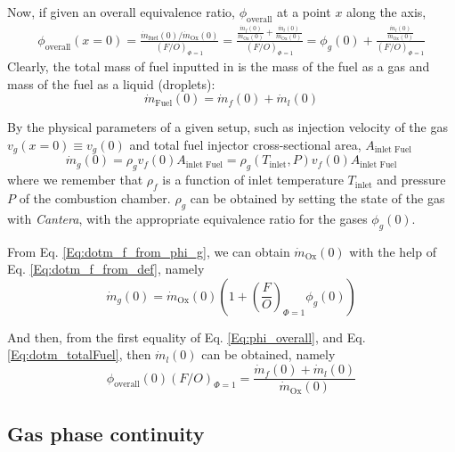 \documentclass[10pt]{amsart}
\begin{document}
\begin{multicols*}{2}
Now, if given an overall equivalence ratio, $\phi_{\text{overall}}$ at a point $x$ along the axis,
\begin{equation}\label{Eq:phi_overall}
\begin{gathered}
  \phi_{\text{overall}}(x=0) = \frac{ \dot{m}_{\text{fuel}}(0)/ \dot{m}_{\text{Ox}}(0) }{ (F/O)_{\Phi=1} } = \frac{ \frac{\dot{m}_f(0) }{ \dot{m}_{\text{Ox}}(0) } + \frac{\dot{m}_l(0) }{ \dot{m}_{\text{Ox}}(0) } }{ (F/O)_{\Phi=1} } = \phi_g(0) + \frac{ \frac{\dot{m}_l(0) }{ \dot{m}_{\text{Ox}}(0) } }{ (F/O)_{\Phi=1} }
\end{gathered}
\end{equation}
Clearly, the total mass of fuel inputted in is the mass of the fuel as a gas and mass of the fuel as a liquid (droplets):
\begin{equation}\label{Eq:dotm_totalFuel}
\dot{m}_{\text{Fuel}}(0) = \dot{m}_f(0) + \dot{m}_l(0)
\end{equation}

By the physical parameters of a given setup, such as injection velocity of the gas $v_g(x=0)\equiv v_g(0)$ and total fuel injector cross-sectional area, $A_{\text{inlet Fuel}}$ 
\begin{equation}\label{Eq:dotm_f_from_def}
\dot{m}_g(0) = \rho_g v_f(0) A_{\text{inlet Fuel}} = \rho_g(T_{\text{inlet}},P) v_f(0) A_{\text{inlet Fuel}} 
\end{equation}
where we remember that $\rho_f$ is a function of inlet temperature $T_{\text{inlet}}$ and pressure $P$ of the combustion chamber.  $\rho_g$ can be obtained by setting the state of the gas with \emph{Cantera}, with the appropriate equivalence ratio for the gases $\phi_g(0)$.  

From Eq. \ref{Eq:dotm_f_from_phi_g}, we can obtain $\dot{m}_{\text{Ox}}(0)$ with the help of Eq. \ref{Eq:dotm_f_from_def}, namely 
\[
\dot{m}_g(0) = \dot{m}_{\text{Ox}}(0) \left( 1 + \left( \frac{F}{O} \right)_{\Phi=1} \phi_g(0) \right)
\]  

And then, from the first equality of Eq. \ref{Eq:phi_overall}, and Eq. \ref{Eq:dotm_totalFuel}, then $\dot{m}_l(0)$ can be obtained, namely
\[
\phi_{\text{overall}}(0) (F/O)_{\Phi=1} = \frac{ \dot{m}_f(0) + \dot{m}_l(0) }{ \dot{m}_{\text{Ox}}(0) }
\]  

\subsection{Gas phase continuity}


\end{multicols*}
\end{document}
